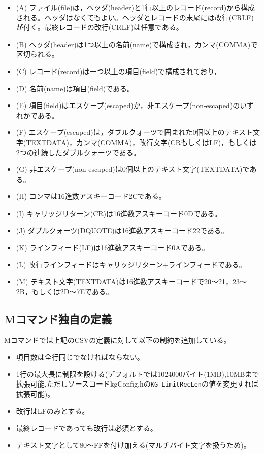 \begin{itemize}
\item (A) ファイル(file)は，ヘッダ(header)と1行以上のレコード(record)から構成される。ヘッダはなくてもよい。ヘッダとレコードの末尾には改行(CRLF)が付く。最終レコードの改行(CRLF)は任意である。
\item (B) ヘッダ(header)は1つ以上の名前(name)で構成され，カンマ(COMMA)で区切られる。
\item (C) レコード(record)は一つ以上の項目(field)で構成されており，
\item (D) 名前(name)は項目(field)である。
\item (E) 項目(field)はエスケープ(escaped)か，非エスケープ(non-escaped)のいずれかである。
\item (F) エスケープ(escaped)は，ダブルクォーツで囲まれた0個以上のテキスト文字(TEXTDATA)，カンマ(COMMA)，改行文字(CRもしくはLF)，もしくは2つの連続したダブルクォーツである。
\item (G) 非エスケープ(non-escaped)は0個以上のテキスト文字(TEXTDATA)である。
\item (H) コンマは16進数アスキーコード2Cである。
\item (I) キャリッジリターン(CR)は16進数アスキーコード0Dである。
\item (J) ダブルクォーツ(DQUOTE)は16進数アスキーコード22である。
\item (K) ラインフィード(LF)は16進数アスキーコード0Aである。
\item (L) 改行ラインフィードはキャリッジリターン+ラインフィードである。
\item (M) テキスト文字(TEXTDATA)は16進数アスキーコードで20〜21，23〜2B，もしくは2D〜7Eである。
\end{itemize}


\subsection{Mコマンド独自の定義}

Mコマンドでは上記のCSVの定義に対して以下の制約を追加している。

\begin{itemize}
\item 項目数は全行同じでなければならない。
\item 1行の最大長に制限を設ける(デフォルトでは1024000バイト(1MB),10MBまで拡張可能,ただしソースコードkgConfig.hの\verb|KG_LimitRecLen|の値を変更すれば拡張可能)。
\item 改行はLFのみとする。
\item 最終レコードであっても改行は必須とする。
\item テキスト文字として80〜FFを付け加える(マルチバイト文字を扱うため)。 
\end{itemize}

